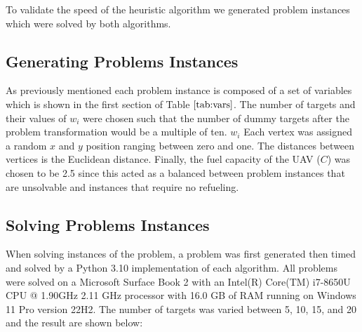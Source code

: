 To validate the speed of the heuristic algorithm we generated problem instances which were solved by both algorithms.

\subsection{Generating Problems Instances}

As previously mentioned each problem instance is composed of a set of variables which is shown in the first section of Table $\ref{tab:vars}$. The number of targets and their values of $w_i$ were chosen such that the number of dummy targets after the problem transformation would be a multiple of ten. $w_i$ Each vertex was assigned a random $x$ and $y$ position ranging between zero and one. The distances between vertices is the Euclidean distance. Finally, the fuel capacity of the UAV ($C$) was chosen to be 2.5 since this acted as a balanced between problem instances that are unsolvable and instances that require no refueling.

\subsection{Solving Problems Instances}

When solving instances of the problem, a problem was first generated then timed and solved by a Python 3.10 implementation of each algorithm. All problems were solved on a Microsoft Surface Book 2 with an Intel(R) Core(TM) i7-8650U CPU @ 1.90GHz 2.11 GHz processor with 16.0 GB of RAM running on Windows 11 Pro version 22H2. The number of targets was varied between 5, 10, 15, and 20 and the result are shown below: